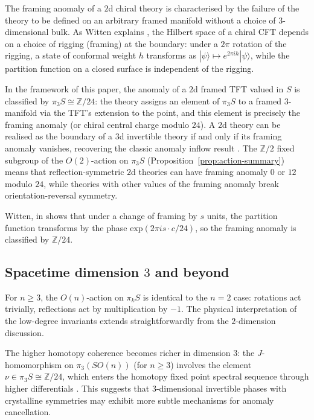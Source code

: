 \documentclass{amsart}
\begin{document}
\begin{remark}
\label{rem:framing-anomaly}
The framing anomaly of a $2$d chiral theory is characterised by the failure of the theory to be defined on an arbitrary framed manifold without a choice of $3$-dimensional bulk. As Witten explains \cite[pp.~191--192]{witten1992holomorphic}, the Hilbert space of a chiral CFT depends on a choice of rigging (framing) at the boundary: under a $2\pi$ rotation of the rigging, a state of conformal weight $h$ transforms as $|\psi\rangle \mapsto e^{2\pi i h}|\psi\rangle$, while the partition function on a closed surface is independent of the rigging.

In the framework of this paper, the anomaly of a $2$d framed TFT valued in $S$ is classified by $\pi_3 S \cong \mathbb{Z}/24$: the theory assigns an element of $\pi_3 S$ to a framed $3$-manifold via the TFT's extension to the point, and this element is precisely the framing anomaly (or chiral central charge modulo $24$). A $2$d theory can be realised as the boundary of a $3$d invertible theory if and only if its framing anomaly vanishes, recovering the classic anomaly inflow result \cite{witten1989quantum}. The $\mathbb{Z}/2$ fixed subgroup of the $O(2)$-action on $\pi_3 S$ (Proposition~\ref{prop:action-summary}) means that reflection-symmetric $2$d theories can have framing anomaly $0$ or $12$ modulo $24$, while theories with other values of the framing anomaly break orientation-reversal symmetry.
\end{remark}

\begin{remark}\label{rem:Z/24}
    Witten, in \cite[Equations 2.24, 2.25, 4.41]{witten1989quantum} shows that under a change of framing by $s$ units, the partition function transforms by the phase $\text{exp}(2\pi is\cdot c/24)$, so the framing anomaly is classified by $\mathbb{Z}/24$.
\end{remark}

\subsection{Spacetime dimension \texorpdfstring{$3$}{3} and beyond}

For $n \ge 3$, the $O(n)$-action on $\pi_k S$ is identical to the $n=2$ case: rotations act trivially, reflections act by multiplication by $-1$. The physical interpretation of the low-degree invariants extends straightforwardly from the $2$-dimension discussion.

The higher homotopy coherence becomes richer in dimension $3$: the $J$-homomorphism on $\pi_3(SO(n))$ (for $n \ge 3$) involves the element $\nu \in \pi_3 S \cong \mathbb{Z}/24$, which enters the homotopy fixed point spectral sequence through higher differentials \cite{adams1963groups}. This suggests that $3$-dimensional invertible phases with crystalline symmetries may exhibit more subtle mechanisms for anomaly cancellation.
\end{document}
